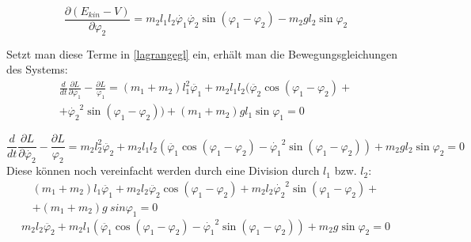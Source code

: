 \begin{equation}
\frac{\partial (E_{kin} - V)}{\partial \varphi_2} = m_2 l_1 l_2 \dot{\varphi_1} \dot{\varphi_2} \sin (\varphi_1 - \varphi_2) - m_2 g l_2 \sin \varphi_2
\end{equation}

Setzt man diese Terme in \eqref{lagrangegl} ein, erhält man die Bewegungsgleichungen des Systems:
\begin{equation}
\begin{split}
\frac{d}{dt}\frac{\partial L}{\partial\dot{\varphi_1}}-\frac{\partial L}{\varphi_1} = (m_1 + m_2) l_1^2\ddot{\varphi_1} + m_2 l_1 l_2 ( \ddot{\varphi_2} \cos (\varphi_1 - \varphi_2)+\\ + \dot{\varphi_2}^2 \sin (\varphi_1 - \varphi_2)) + (m_1 + m_2) g l_1 \sin \varphi_1 = 0
\end{split}
\end{equation}

\begin{equation}
\frac{d}{dt}\frac{\partial L}{\partial\dot{\varphi_2}}-\frac{\partial L}{\varphi_2} = m_2 l_2^2 \ddot{\varphi_2} + m_2 l_1 l_2 (\ddot{\varphi_1} \cos (\varphi_1 - \varphi_2) - \dot{\varphi_1}^2 \sin (\varphi_1 - \varphi_2)) + m_2 g l_2 \sin \varphi_2 = 0
\end{equation} 
Diese können noch vereinfacht werden durch eine Division durch $l_1$ bzw. $l_2$: 
\begin{equation}
\begin{split}
(m_1 + m_2) l_1\ddot{\varphi_1} + m_2 l_2 \ddot{\varphi_2} \cos (\varphi_1 - \varphi_2) + m_2 l_2 \dot{\varphi_2}^2 \sin (\varphi_1 - \varphi_2) +\\+ (m_1 + m_2) g \ sin \varphi_1 = 0
\end{split}
\label{equ:1}
\end{equation}
\begin{equation}
m_2 l_2 \ddot{\varphi_2} + m_2 l_1 (\ddot{\varphi_1} \cos (\varphi_1 - \varphi_2) - \dot{\varphi_1}^2 \sin (\varphi_1 - \varphi_2)) + m_2 g \sin \varphi_2 = 0
\label{equ:2}
\end{equation}

